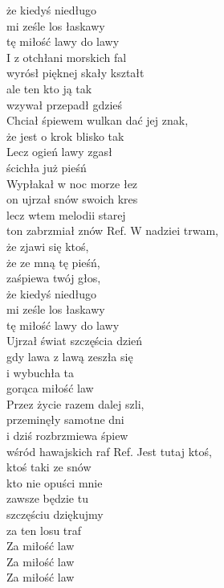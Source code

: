  że kiedyś niedługo\\
 mi ześle los łaskawy\\
 tę miłość lawy do lawy\\
\hop
I z otchłani morskich fal\\
wyrósł pięknej skały kształt\\
ale ten kto ją tak\\
wzywał przepadł gdzieś\\
Chciał śpiewem wulkan dać jej znak, \\
że jest o krok blisko tak\\
Lecz ogień lawy zgasł\\
ścichła już pieśń\\
Wypłakał w noc morze łez\\
on ujrzał snów swoich kres\\
lecz wtem melodii starej\\
ton zabrzmiał znów
\hop
Ref. W nadziei trwam,\\
 że zjawi się ktoś,\\
 że ze mną tę pieśń,\\
 zaśpiewa twój głos,\\
 że kiedyś niedługo\\
 mi ześle los łaskawy\\
 tę miłość lawy do lawy\\
\hop
Ujrzał świat szczęścia dzień\\
gdy lawa z lawą zeszła się\\
i wybuchła ta \\
gorąca miłość law\\
Przez życie razem dalej szli,\\
przeminęły samotne dni\\
i dziś rozbrzmiewa śpiew \\
wśród hawajskich raf
\hop
Ref. Jest tutaj ktoś,\\
 ktoś taki ze snów\\
 kto nie opuści mnie\\
 zawsze będzie tu\\
 szczęściu dziękujmy\\
 za ten losu traf\\
 Za miłość law\\
 Za miłość law\\
 Za miłość law